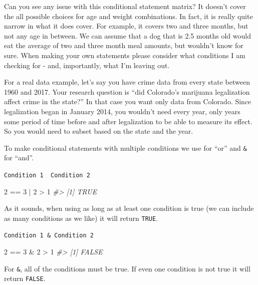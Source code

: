 \documentclass[
]{krantz}
\makeatletter
\newenvironment{Shaded}{\begin{snugshade}}{\end{snugshade}}
\newcommand{\CommentTok}[1]{\textcolor[rgb]{0.37,0.37,0.37}{\textit{#1}}}
\newcommand{\DecValTok}[1]{\textcolor[rgb]{0.06,0.06,0.06}{#1}}
\newcommand{\SpecialCharTok}[1]{\textcolor[rgb]{0,0,0}{#1}}
\newenvironment{kframe}{%
\medskip{}
\setlength{\fboxsep}{.8em}
 \def\at@end@of@kframe{}%
 \ifinner\ifhmode%
  \def\at@end@of@kframe{\end{minipage}}%
  \begin{minipage}{\columnwidth}%
 \fi\fi%
 \def\FrameCommand##1{\hskip\@totalleftmargin \hskip-\fboxsep
 \colorbox{shadecolor}{##1}\hskip-\fboxsep
     \hskip-\linewidth \hskip-\@totalleftmargin \hskip\columnwidth}%
 \MakeFramed {\advance\hsize-\width
   \@totalleftmargin\z@ \linewidth\hsize
   \@setminipage}}%
 {\par\unskip\endMakeFramed%
 \at@end@of@kframe}
\renewenvironment{Shaded}{\begin{kframe}}{\end{kframe}}
\makeatother
\begin{document}
Can you see any issue with this conditional statement matrix? It doesn't cover the all possible choices for age and weight combinations. In fact, it is really quite narrow in what it does cover. For example, it covers two and three months, but not any age in between. We can assume that a dog that is 2.5 months old would eat the average of two and three month meal amounts, but wouldn't know for sure. When making your own statements please consider what conditions I am checking for - and, importantly, what I'm leaving out.

For a real data example, let's say you have crime data from every state between 1960 and 2017. Your research question is ``did Colorado's marijuana legalization affect crime in the state?'' In that case you want only data from Colorado. Since legalization began in January 2014, you wouldn't need every year, only years some period of time before and after legalization to be able to measure its effect. So you would need to subset based on the state and the year.

To make conditional statements with multiple conditions we use \texttt{\textbar{}} for ``or'' and \texttt{\&} for ``and''.

\texttt{Condition\ 1\ \textbar{}\ Condition\ 2}

\begin{Shaded}
\begin{Highlighting}[]
\DecValTok{2} \SpecialCharTok{==} \DecValTok{3} \SpecialCharTok{|} \DecValTok{2} \SpecialCharTok{\textgreater{}} \DecValTok{1}
\CommentTok{\#\textgreater{} [1] TRUE}
\end{Highlighting}
\end{Shaded}

As it sounds, when using \texttt{\textbar{}} as long as at least one condition is true (we can include as many conditions as we like) it will return \texttt{TRUE}.

\texttt{Condition\ 1\ \&\ Condition\ 2}

\begin{Shaded}
\begin{Highlighting}[]
\DecValTok{2} \SpecialCharTok{==} \DecValTok{3} \SpecialCharTok{\&} \DecValTok{2} \SpecialCharTok{\textgreater{}} \DecValTok{1}
\CommentTok{\#\textgreater{} [1] FALSE}
\end{Highlighting}
\end{Shaded}

For \texttt{\&}, all of the conditions must be true. If even one condition is not true it will return \texttt{FALSE}.
\end{document}
